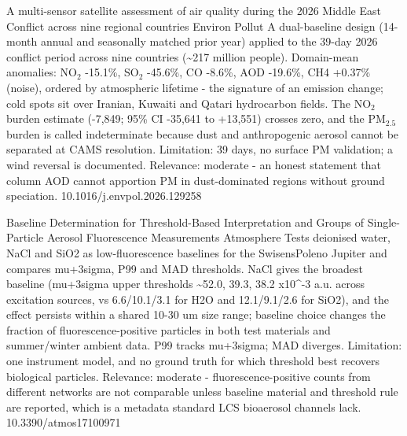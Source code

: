 \documentclass[10pt]{article}
\begin{document}
{A multi-sensor satellite assessment of air quality during the 2026 Middle East Conflict across nine regional countries}
{Environ Pollut}
{A dual-baseline design (14-month annual and seasonally matched prior year) applied to the 39-day 2026 conflict period across nine countries (\textasciitilde{}217 million people). Domain-mean anomalies: NO$_2$ -15.1\%, SO$_2$ -45.6\%, CO -8.6\%, AOD -19.6\%, CH4 +0.37\% (noise), ordered by atmospheric lifetime - the signature of an emission change; cold spots sit over Iranian, Kuwaiti and Qatari hydrocarbon fields. The NO$_2$ burden estimate (-7,849; 95\% CI -35,641 to +13,551) crosses zero, and the PM$_{2.5}$ burden is called indeterminate because dust and anthropogenic aerosol cannot be separated at CAMS resolution. Limitation: 39 days, no surface PM validation; a wind reversal is documented. Relevance: moderate - an honest statement that column AOD cannot apportion PM in dust-dominated regions without ground speciation.}
{10.1016/j.envpol.2026.129258}

\par{}\baselineskip{}\baselineskip
{}

{Baseline Determination for Threshold-Based Interpretation and Groups of Single-Particle Aerosol Fluorescence Measurements}
{Atmosphere}
{Tests deionised water, NaCl and SiO2 as low-fluorescence baselines for the SwisensPoleno Jupiter and compares mu+3sigma, P99 and MAD thresholds. NaCl gives the broadest baseline (mu+3sigma upper thresholds \textasciitilde{}52.0, 39.3, 38.2 x10\textasciicircum{}-3 a.u. across excitation sources, vs 6.6/10.1/3.1 for H2O and 12.1/9.1/2.6 for SiO2), and the effect persists within a shared 10-30 um size range; baseline choice changes the fraction of fluorescence-positive particles in both test materials and summer/winter ambient data. P99 tracks mu+3sigma; MAD diverges. Limitation: one instrument model, and no ground truth for which threshold best recovers biological particles. Relevance: moderate - fluorescence-positive counts from different networks are not comparable unless baseline material and threshold rule are reported, which is a metadata standard LCS bioaerosol channels lack.}
{10.3390/atmos17100971}
\end{document}
